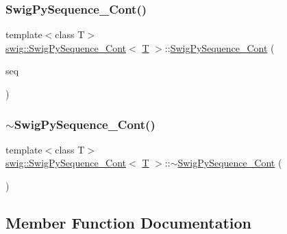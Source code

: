 \subsubsection{\texorpdfstring{Swig\+Py\+Sequence\+\_\+\+Cont()}{SwigPySequence\_Cont()}}
{\footnotesize\ttfamily template$<$class T$>$ \\
\hyperlink{structswig_1_1_swig_py_sequence___cont}{swig\+::\+Swig\+Py\+Sequence\+\_\+\+Cont}$<$ \hyperlink{fmt_8h_a0acb682b8260ab1c60b918599864e2e5}{T} $>$\+::\hyperlink{structswig_1_1_swig_py_sequence___cont}{Swig\+Py\+Sequence\+\_\+\+Cont} (\begin{DoxyParamCaption}\item[{Py\+Object $\ast$}]{seq }\end{DoxyParamCaption})\hspace{0.3cm}{\ttfamily [inline]}}

\mbox{\label{structswig_1_1_swig_py_sequence___cont_a6996bb785dd210fa0ec7c35ffcecfe2b}} 
\subsubsection{\texorpdfstring{$\sim$\+Swig\+Py\+Sequence\+\_\+\+Cont()}{~SwigPySequence\_Cont()}}
{\footnotesize\ttfamily template$<$class T$>$ \\
\hyperlink{structswig_1_1_swig_py_sequence___cont}{swig\+::\+Swig\+Py\+Sequence\+\_\+\+Cont}$<$ \hyperlink{fmt_8h_a0acb682b8260ab1c60b918599864e2e5}{T} $>$\+::$\sim$\hyperlink{structswig_1_1_swig_py_sequence___cont}{Swig\+Py\+Sequence\+\_\+\+Cont} (\begin{DoxyParamCaption}{ }\end{DoxyParamCaption})\hspace{0.3cm}{\ttfamily [inline]}}



\subsection{Member Function Documentation}
\mbox{\label{structswig_1_1_swig_py_sequence___cont_a6c664b1e10c7f14f8b382e429a25bf18}} 
